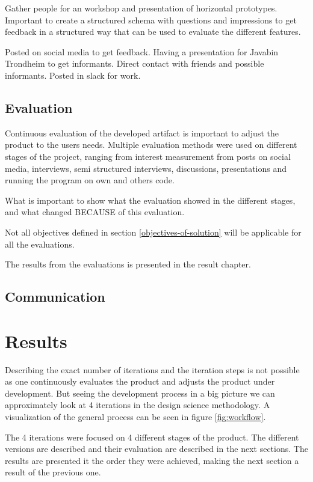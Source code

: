 \documentclass{report}
\begin{document}
Gather people for an workshop and presentation of horizontal prototypes. Important to create a structured schema with questions and impressions to get feedback in a structured way that can be used to evaluate the different features.

Posted on social media to get feedback. Having a presentation for Javabin Trondheim to get informants. Direct contact with friends and possible informants. Posted in slack for work.
 
\section{Evaluation}
Continuous evaluation of the developed artifact is important to adjust the product to the users needs. Multiple evaluation methods were used on different stages of the project, ranging from interest measurement from posts on social media, interviews, semi structured interviews, discussions, presentations and running the program on own and others code.

What is important to show what the evaluation showed in the different stages, and what changed BECAUSE of this evaluation. 


Not all objectives defined in section \ref{objectives-of-solution} will be applicable for all the evaluations.

The results from the evaluations is presented in the result chapter.


\section{Communication}


\chapter{Results}
Describing the exact number of iterations and the iteration steps is not possible as one continuously evaluates the product and adjusts the product under development. But seeing the development process in a big picture we can approximately look at 4 iterations in the design science methodology. A visualization of the general process can be seen in figure \ref{fig:workflow}.

The 4 iterations were focused on 4 different stages of the product. The different versions are described and their evaluation are described in the next sections. The results are presented it the order they were achieved, making the next section a result of the previous one.
\end{document}
